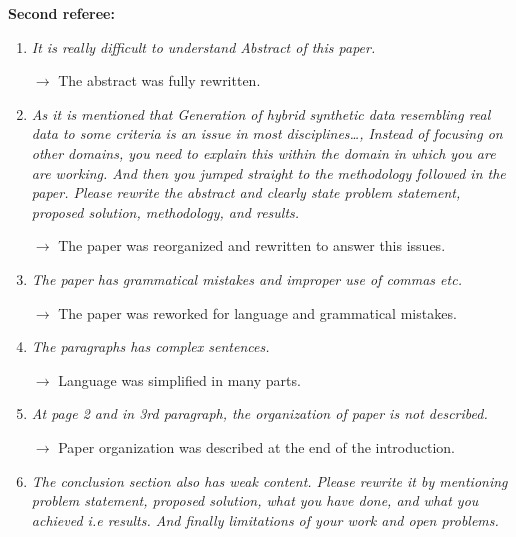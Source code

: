 \documentclass[11pt,a4paper,sans]{moderncv}        %
\begin{document}
\bigskip
\bigskip

\textbf{Second referee:}




 
\begin{enumerate}
	\item \textit{It is really difficult to understand Abstract of this paper.}
	
	$\rightarrow$ The abstract was fully rewritten.
	
	\medskip
 
    \item \textit{As it is mentioned that Generation of hybrid synthetic data resembling real data to some criteria is an issue in most disciplines\ldots , Instead of focusing on other domains, you need to explain this within the domain in which you are are working. And then you jumped straight to the methodology followed in the paper. Please rewrite the abstract and clearly state problem statement,  proposed solution, methodology, and results.}
    
    $\rightarrow$ The paper was reorganized and rewritten to answer this issues.
    
    \medskip
    
    \item \textit{The paper has grammatical mistakes and improper use of commas etc.}
    
    $\rightarrow$ The paper was reworked for language and grammatical mistakes.
    
	\medskip
    
    \item \textit{The paragraphs has complex sentences.}
    
    $\rightarrow$ Language was simplified in many parts.
    
    \medskip
    
    \item \textit{At page 2 and in 3rd paragraph, the organization of paper is not described.}
    
    $\rightarrow$ Paper organization was described at the end of the introduction.
    
    \medskip
    
    \item \textit{The conclusion section also has weak content. Please rewrite it by mentioning problem statement, proposed solution, what you have done, and what you achieved i.e results. And finally limitations of your work and open problems.}
    

\end{enumerate}
\end{document}

